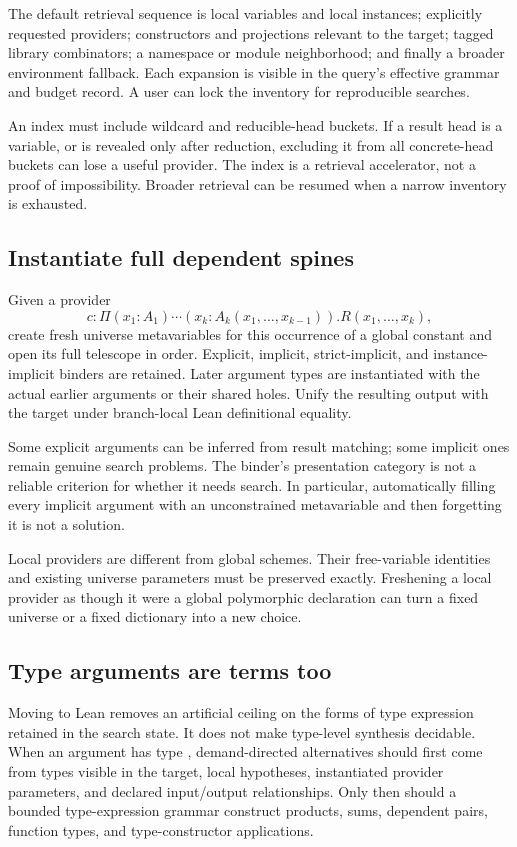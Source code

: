 The default retrieval sequence is local variables and local instances; explicitly requested providers; constructors and projections relevant to the target; tagged library combinators; a namespace or module neighborhood; and finally a broader environment fallback. Each expansion is visible in the query's effective grammar and budget record. A user can lock the inventory for reproducible searches.

An index must include wildcard and reducible-head buckets. If a result head is a variable, or is revealed only after reduction, excluding it from all concrete-head buckets can lose a useful provider. The index is a retrieval accelerator, not a proof of impossibility. Broader retrieval can be resumed when a narrow inventory is exhausted.

\subsection{Instantiate full dependent spines}
Given a provider
\[
 c:\Pi(x_1:A_1)\cdots(x_k:A_k(x_1,\ldots,x_{k-1})).R(x_1,\ldots,x_k),
\]
create fresh universe metavariables for this occurrence of a global constant and open its full telescope in order. Explicit, implicit, strict-implicit, and instance-implicit binders are retained. Later argument types are instantiated with the actual earlier arguments or their shared holes. Unify the resulting output with the target under branch-local Lean definitional equality.

Some explicit arguments can be inferred from result matching; some implicit ones remain genuine search problems. The binder's presentation category is not a reliable criterion for whether it needs search. In particular, automatically filling every implicit argument with an unconstrained metavariable and then forgetting it is not a solution.

Local providers are different from global schemes. Their free-variable identities and existing universe parameters must be preserved exactly. Freshening a local provider as though it were a global polymorphic declaration can turn a fixed universe or a fixed dictionary into a new choice.

\subsection{Type arguments are terms too}
Moving to Lean removes an artificial ceiling on the forms of type expression retained in the search state. It does not make type-level synthesis decidable. When an argument has type , demand-directed alternatives should first come from types visible in the target, local hypotheses, instantiated provider parameters, and declared input/output relationships. Only then should a bounded type-expression grammar construct products, sums, dependent pairs, function types, and type-constructor applications.

